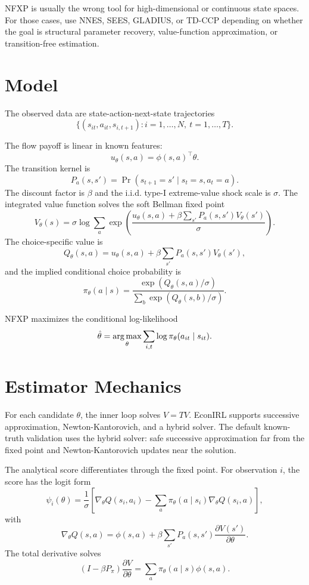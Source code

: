 \documentclass[10pt]{article}
\begin{document}
NFXP is usually the wrong tool for high-dimensional or continuous state spaces.
For those cases, use NNES, SEES, GLADIUS, or TD-CCP depending on whether the
goal is structural parameter recovery, value-function approximation, or
transition-free estimation.

\section{Model}

The observed data are state-action-next-state trajectories
\[
\{(s_{it}, a_{it}, s_{i,t+1}) : i=1,\ldots,N,\ t=1,\ldots,T\}.
\]

The flow payoff is linear in known features:
\[
u_\theta(s,a) = \phi(s,a)^\top \theta.
\]
The transition kernel is
\[
P_a(s,s') = \Pr(s_{t+1}=s' \mid s_t=s, a_t=a).
\]
The discount factor is $\beta$ and the i.i.d. type-I extreme-value shock scale
is $\sigma$. The integrated value function solves the soft Bellman fixed point
\[
V_\theta(s)
= \sigma \log \sum_a
\exp\left(
\frac{
u_\theta(s,a)
+ \beta \sum_{s'} P_a(s,s') V_\theta(s')
}{\sigma}
\right).
\]
The choice-specific value is
\[
Q_\theta(s,a)
= u_\theta(s,a) + \beta \sum_{s'} P_a(s,s')V_\theta(s'),
\]
and the implied conditional choice probability is
\[
\pi_\theta(a \mid s)
=
\frac{\exp(Q_\theta(s,a)/\sigma)}
{\sum_b \exp(Q_\theta(s,b)/\sigma)}.
\]

NFXP maximizes the conditional log-likelihood
\[
\hat{\theta}
=
\operatorname*{arg\,max}_\theta
\sum_{i,t} \log \pi_\theta(a_{it} \mid s_{it}).
\]

\section{Estimator Mechanics}

For each candidate $\theta$, the inner loop solves $V=TV$. EconIRL supports
successive approximation, Newton-Kantorovich, and a hybrid solver. The default
known-truth validation uses the hybrid solver: safe successive approximation
far from the fixed point and Newton-Kantorovich updates near the solution.

The analytical score differentiates through the fixed point. For observation
$i$, the score has the logit form
\[
\psi_i(\theta)
=
\frac{1}{\sigma}
\left[
\nabla_\theta Q(s_i,a_i)
-
\sum_a \pi_\theta(a\mid s_i)\nabla_\theta Q(s_i,a)
\right],
\]
with
\[
\nabla_\theta Q(s,a)
=
\phi(s,a)
+
\beta \sum_{s'} P_a(s,s')\frac{\partial V(s')}{\partial \theta}.
\]
The total derivative solves
\[
(I-\beta P_\pi)\frac{\partial V}{\partial \theta}
=
\sum_a \pi_\theta(a\mid s)\phi(s,a).
\]
\end{document}
